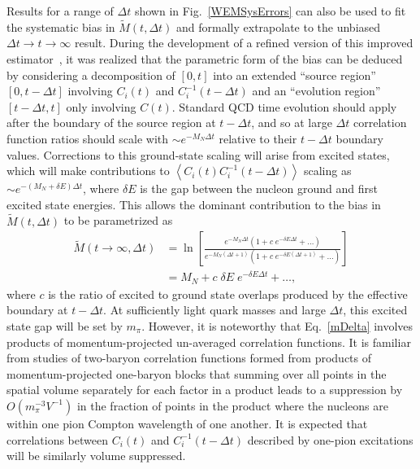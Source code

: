 Results for a range of $\Delta t$ shown in Fig.~\ref{WEMSysErrors} can also be used to fit the systematic bias in $\tilde{M}(t, \Delta t)$ and formally extrapolate to the unbiased $\Delta t\rightarrow t\rightarrow \infty$ result. 
During the development of a refined version of this improved estimator~\cite{Wagman:2017xfh},
it was realized that the parametric form of the bias can be deduced by 
considering a decomposition of $[0,t]$ into an extended ``source region'' $[0,t-\Delta t]$ involving $C_i(t)$ and $C_i^{-1}(t-\Delta t)$ and an ``evolution region'' $[t-\Delta t, t]$ only involving $C(t)$.
Standard QCD time evolution should apply after the boundary of the source region at $t-\Delta t$, and so at large $\Delta t$ correlation function ratios should scale with $\sim e^{-M_N \Delta t}$ relative to their $t-\Delta t$ boundary values.
Corrections to this ground-state scaling will arise from excited states, which will make contributions to $\left<C_i(t)C_i^{-1}(t-\Delta t)\right>$ scaling as $\sim e^{-(M_N + \delta E)\Delta t}$, where $\delta E$ is the gap between the nucleon ground and first excited state energies.
This allows the dominant contribution to the bias in $\tilde{M}(t,\Delta t)$ to be parametrized as
\begin{equation}
  \begin{split}
    \tilde{M}(t\rightarrow\infty, \Delta t) &= \ln\left[ \frac{e^{-M_N \Delta t}\left( 1 + c\; e^{-\delta E \Delta t} + \dots \right)}{e^{-M_N(\Delta t + 1)}\left( 1 + c\; e^{-\delta E (\Delta t + 1)} + \dots \right)} \right] \\
    & = M_N + c\; \delta E\; e^{-\delta E \Delta t} + \dots,
  \end{split}\label{mExtrap}
\end{equation}
where $c$ is the ratio of excited to ground state overlaps produced by the effective boundary at $t-\Delta t$.
At sufficiently light quark masses and large $\Delta t$, this excited state gap will be set by $m_\pi$.
However, it is noteworthy that Eq.~\eqref{mDelta} involves products of momentum-projected un-averaged correlation functions.
It is familiar from studies of two-baryon correlation functions formed from products of momentum-projected one-baryon blocks that summing over all points in the spatial volume separately for each factor in a product leads to a suppression by $O(m_\pi^{-3}V^{-1})$ in the fraction of points in the product where the nucleons are within one pion Compton wavelength of one another.
It is expected that correlations between $C_i(t)$ and $C_i^{-1}(t-\Delta t)$ described by one-pion excitations will be similarly volume suppressed.
